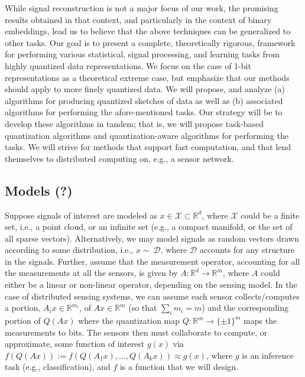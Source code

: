 \documentclass{article}
\newcommand{\comment}[3]{{\color{#1} {\bf #2 :} #3}}
\newcommand{\yoav}[1]{\comment{magenta}{Yoav}{#1}}
\newcommand{\rayan}[1]{\comment{red}{Rayan}{#1}}
\begin{document}
While signal reconstruction is not a major focus of our work, the promising results obtained in that context, and particularly in the context of binary embeddings, lead us to believe that the above techniques can be generalized to other tasks. 
Our goal  is to present a complete, theoretically rigorous, framework for performing various statistical, signal processing, and learning tasks from highly quantized data representations. We focus on the case of 1-bit representations as a theoretical extreme case, but emphasize that our methods should apply to more finely quantized data. We will propose, and analyze  (a) algorithms for  producing quantized sketches of data as well as (b) associated algorithms for performing the afore-mentioned tasks. Our strategy will be to develop these algorithms in tandem; that is, we will propose task-based quantization algorithms and quantization-aware algorithms for performing the tasks. We will strive for methods that support fast computation, and that lend themselves to distributed computing on, e.g., a sensor network.

\subsection{Models (?)}
Suppose signals of interest are modeled as $x\in \mathcal{X} \subset \mathbb{R}^d$, where $\mathcal{X}$ could be a finite set, i.e., a point cloud, or an infinite set (e.g., a compact manifold, or the set of all sparse vectors). Alternatively, we may model signals as random vectors drawn according to some distribution, i.e., $x\sim~\mathcal{D}$, where $\mathcal{D}$ accounts for any structure in the signals. Further, assume that the measurement operator, accounting for all the measurements at all the sensors, is given by $A:\mathbb{R}^d \to \mathbb{R}^m$, where $A$ could either be a linear or non-linear operator, depending on the sensing model.  In the case of distributed sensing systems, we can assume each sensor collects/computes a portion, $A_i x \in \mathbb{R}^{m_i}$, of $Ax \in \mathbb{R}^m$ (so that $\sum_i{m_i}=m$) and the corresponding portion of ${Q}(Ax)$ where the quantization map $Q: \mathbb{R}^m \to \{\pm 1\}^m $ maps the measurements to bits. The sensors then must collaborate to compute, or approximate, some function of interest $g(x)$ via $f(Q(Ax)):=f\left(Q(A_1x),...,Q(A_kx)\right)\approx g(x)$, where $g$ is an inference task (e.g., classification), and $f$ is a function that we will design.
\end{document}
